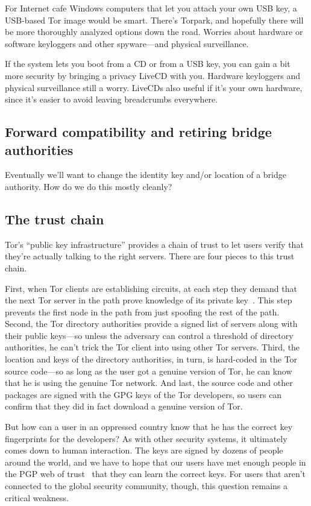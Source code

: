\documentclass{llncs}
\begin{document}
For Internet cafe Windows computers that let you attach your own USB key,
a USB-based Tor image would be smart. There's Torpark, and hopefully
there will be more thoroughly analyzed options down the road. Worries
about hardware or
software keyloggers and other spyware---and physical surveillance.

If the system lets you boot from a CD or from a USB key, you can gain
a bit more security by bringing a privacy LiveCD with you. Hardware
keyloggers and physical surveillance still a worry. LiveCDs also useful
if it's your own hardware, since it's easier to avoid leaving breadcrumbs
everywhere.

\subsection{Forward compatibility and retiring bridge authorities}

Eventually we'll want to change the identity key and/or location
of a bridge authority. How do we do this mostly cleanly?

\subsection{The trust chain}
\label{subsec:trust-chain}

Tor's ``public key infrastructure'' provides a chain of trust to
let users verify that they're actually talking to the right servers.
There are four pieces to this trust chain.

First, when Tor clients are establishing circuits, at each step
they demand that the next Tor server in the path prove knowledge of
its private key~\cite{tor-design}. This step prevents the first node
in the path from just spoofing the rest of the path. Second, the
Tor directory authorities provide a signed list of servers along with
their public keys---so unless the adversary can control a threshold
of directory authorities, he can't trick the Tor client into using other
Tor servers. Third, the location and keys of the directory authorities,
in turn, is hard-coded in the Tor source code---so as long as the user
got a genuine version of Tor, he can know that he is using the genuine
Tor network. And last, the source code and other packages are signed
with the GPG keys of the Tor developers, so users can confirm that they
did in fact download a genuine version of Tor.

But how can a user in an oppressed country know that he has the correct
key fingerprints for the developers? As with other security systems, it
ultimately comes down to human interaction. The keys are signed by dozens
of people around the world, and we have to hope that our users have met
enough people in the PGP web of trust~\cite{pgp-wot} that they can learn
the correct keys. For users that aren't connected to the global security
community, though, this question remains a critical weakness.
\end{document}
